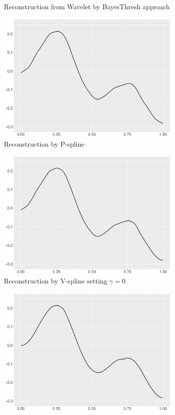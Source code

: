 \begin{figure}
\begin{subfigure}{0.45\textwidth}
    \caption{Reconstruction from Wavelet by BayesThresh approach}
    \end{subfigure}
    \begin{subfigure}{0.45\textwidth}
    \centering
    \includegraphics[width=\linewidth,height=0.45\textwidth]{Chapters/02TractorSplineTheory/plot/ggplot/ggHeaviSinePSpline.pdf}
    \caption{Reconstruction by P-spline}
    \end{subfigure}
    \begin{subfigure}{0.45\textwidth}
    \centering
    \includegraphics[width=\linewidth,height=0.45\textwidth]{Chapters/02TractorSplineTheory/plot/ggplot/ggHeaviSineGamma.pdf}
    \caption{Reconstruction by V-spline setting $\gamma=0$}
    \end{subfigure}
  \begin{subfigure}{0.45\textwidth}
    \centering
    \includegraphics[width=\linewidth,height=0.45\textwidth]{Chapters/02TractorSplineTheory/plot/ggplot/ggHeaviSineTractorAPT.pdf}

\end{subfigure}
\end{figure}

